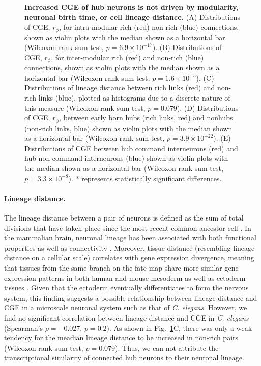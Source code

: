 \documentclass[10pt,letterpaper]{article}
\begin{document}
{\begin{figure}[!h]
\centering
 \caption{
 \textbf{Increased CGE of hub neurons is not driven by modularity, neuronal birth time, or cell lineage distance.}
(A) Distributions of CGE, $r_\phi$, for intra-modular rich (red) non-rich (blue) connections, shown as violin plots with the median shown as a horizontal bar (Wilcoxon rank sum test, $p = 6.9 \times 10^{-17}$).
(B) Distributions of CGE, $r_\phi$, for inter-modular rich (red) and non-rich (blue) connections, shown as violin plots with the median shown as a horizontal bar (Wilcoxon rank sum test, $p = 1.6 \times 10^{-5}$).
(C) Distributions of lineage distance between rich links (red) and non-rich links (blue), plotted as histograms due to a discrete nature of this measure (Wilcoxon rank sum test, $p = 0.079$).
(D) Distributions of CGE, $r_\phi$, between early born hubs (rich links, red) and nonhubs (non-rich links, blue) shown as violin plots with the median shown as a horizontal bar (Wilcoxon rank sum test, $p = 3.9 \times 10^{-22}$).
(E) Distributions of CGE between hub command interneurons (red) and hub non-command interneurons (blue) shown as violin plots with the median shown as a horizontal bar (Wilcoxon rank sum test, $p = 3.3 \times 10^{-8}$).
* represents statistically significant differences.
}
 \label{fig:Fig8}
\end{figure}

\paragraph{Lineage distance.}
The lineage distance between a pair of neurons is defined as the sum of total divisions that have taken place since the most recent common ancestor cell \cite{Pavlovic:2014gx, Sulston1977, Sulston1983}.
In the mammalian brain, neuronal lineage has been associated with both functional properties \cite{Ciceri2013, Li2012} as well as connectivity \cite{Yu2012}.
Moreover, tissue distance (resembling lineage distance on a cellular scale) correlates with gene expression divergence, meaning that tissues from the same branch on the fate map share more similar gene expression patterns in both human and mouse mesoderm as well as ectoderm tissues \cite{Cui2007}.
Given that the ectoderm eventually differentiates to form the nervous system, this finding suggests a possible relationship between lineage distance and CGE in a microscale neuronal system such as that of \textit{C. elegans}.
However, we find no significant correlation between lineage distance and CGE in \textit{C. elegans} (Spearman's $\rho = -0.027$, $p = 0.2$).
As shown in Fig.~\ref{fig:Fig8}C, there was only a weak tendency for the meadian lineage distance to be increased in non-rich pairs (Wilcoxon rank sum test, $p = 0.079$).
Thus, we can not attribute the transcriptional similarity of connected hub neurons to their neuronal lineage.


}
\end{document}
